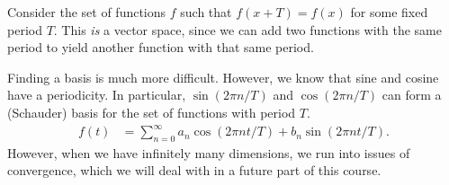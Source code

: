\documentclass[10pt]{mypackage}
\begin{document}
\begin{example}
Consider the set of functions $f$ such that $f(x + T) = f(x)$ for some fixed period $T$. This \textit{is} a vector space, since we can add two functions with the same period to yield another function with that same period.\newline

Finding a basis is much more difficult. However, we know that sine and cosine have a periodicity. In particular, $\sin(2\pi n/T)$ and $\cos(2\pi n/T)$ can form a (Schauder) basis for the set of functions with period $T$.
\begin{align*}
  f(t) &= \sum_{n=0}^{\infty} a_n\cos(2\pi nt/T) + b_n\sin(2\pi nt/T).
\end{align*}
However, when we have infinitely many dimensions, we run into issues of convergence, which we will deal with in a future part of this course.
\end{example}
\end{document}
